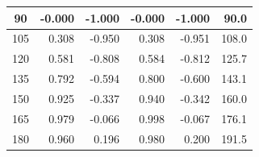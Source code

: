 \begin{table}[htbp]
\begin{center}
\begin{tabular}{|p{15 mm}|p{15 mm}|p{15 mm}|p{15 mm}|p{15 mm}|p{15 mm}|}
            \multicolumn{1}{|c|}{90}                   & \multicolumn{1}{|r|}{-0.000}                                  & \multicolumn{1}{|r|}{-1.000}                                  & \multicolumn{1}{|r|}{-0.000}               & \multicolumn{1}{|r|}{-1.000}               & \multicolumn{1}{|r|}{90.0}                     \\ \hline
            \multicolumn{1}{|c|}{105}                  & \multicolumn{1}{|r|}{0.308}                                   & \multicolumn{1}{|r|}{-0.950}                                  & \multicolumn{1}{|r|}{0.308}                & \multicolumn{1}{|r|}{-0.951}               & \multicolumn{1}{|r|}{108.0}                    \\ \hline
            \multicolumn{1}{|c|}{120}                  & \multicolumn{1}{|r|}{0.581}                                   & \multicolumn{1}{|r|}{-0.808}                                  & \multicolumn{1}{|r|}{0.584}                & \multicolumn{1}{|r|}{-0.812}               & \multicolumn{1}{|r|}{125.7}                    \\ \hline
            \multicolumn{1}{|c|}{135}                  & \multicolumn{1}{|r|}{0.792}                                   & \multicolumn{1}{|r|}{-0.594}                                  & \multicolumn{1}{|r|}{0.800}                & \multicolumn{1}{|r|}{-0.600}               & \multicolumn{1}{|r|}{143.1}                    \\ \hline
            \multicolumn{1}{|c|}{150}                  & \multicolumn{1}{|r|}{0.925}                                   & \multicolumn{1}{|r|}{-0.337}                                  & \multicolumn{1}{|r|}{0.940}                & \multicolumn{1}{|r|}{-0.342}               & \multicolumn{1}{|r|}{160.0}                    \\ \hline
            \multicolumn{1}{|c|}{165}                  & \multicolumn{1}{|r|}{0.979}                                   & \multicolumn{1}{|r|}{-0.066}                                  & \multicolumn{1}{|r|}{0.998}                & \multicolumn{1}{|r|}{-0.067}               & \multicolumn{1}{|r|}{176.1}                    \\ \hline
            \multicolumn{1}{|c|}{180}                  & \multicolumn{1}{|r|}{0.960}                                   & \multicolumn{1}{|r|}{0.196}                                   & \multicolumn{1}{|r|}{0.980}                & \multicolumn{1}{|r|}{0.200}                & \multicolumn{1}{|r|}{191.5}                    \\ \hline

\end{tabular}
\end{center}
\end{table}

